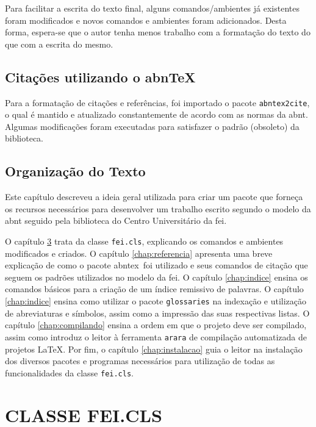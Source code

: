 \documentclass{fei}
\begin{document}
Para facilitar a escrita do texto final, alguns comandos/ambientes já existentes foram modificados e novos comandos e ambientes foram adicionados. Desta forma, espera-se que o autor tenha menos trabalho com a formatação do texto do que com a escrita do mesmo.

\section{Citações utilizando o abn\TeX}

Para a formatação de citações e referências, foi importado o pacote \texttt{abntex2cite}, o qual é mantido e atualizado constantemente de acordo com as normas da \gls{abnt}. Algumas modificações foram executadas para satisfazer o padrão (obsoleto) da biblioteca.

\section{Organização do Texto}

Este capítulo descreveu a ideia geral utilizada para criar um pacote que forneça os recursos necessários para desenvolver um trabalho escrito segundo o modelo da \gls{abnt} seguido pela biblioteca do Centro Universitário da \gls{fei}.

O capítulo \ref{chap:classe} trata da classe \texttt{fei.cls}, explicando os comandos e ambientes modificados e criados. O capítulo \ref{chap:referencia} apresenta uma breve explicação de como o pacote \gls{abntex}~foi utilizado e seus comandos de citação que seguem os padrões utilizados no modelo da \gls{fei}. O capítulo \ref{chap:indice} ensina os comandos básicos para a criação de um índice remissivo de palavras. O capítulo \ref{chap:indice} ensina como utilizar o pacote \texttt{glossaries} na indexação e utilização de abreviaturas e símbolos, assim como a impressão das suas respectivas listas. O capítulo \ref{chap:compilando} ensina a ordem em que o projeto deve ser compilado, assim como introduz o leitor à ferramenta \texttt{arara} de compilação automatizada de projetos \index{\LaTeX}\LaTeX. Por fim, o capítulo \ref{chap:instalacao} guia o leitor na instalação dos diversos pacotes e programas necessários para utilização de todas as funcionalidades da classe \texttt{fei.cls}.

\chapter{CLASSE FEI.CLS}\label{chap:classe}
\end{document}
